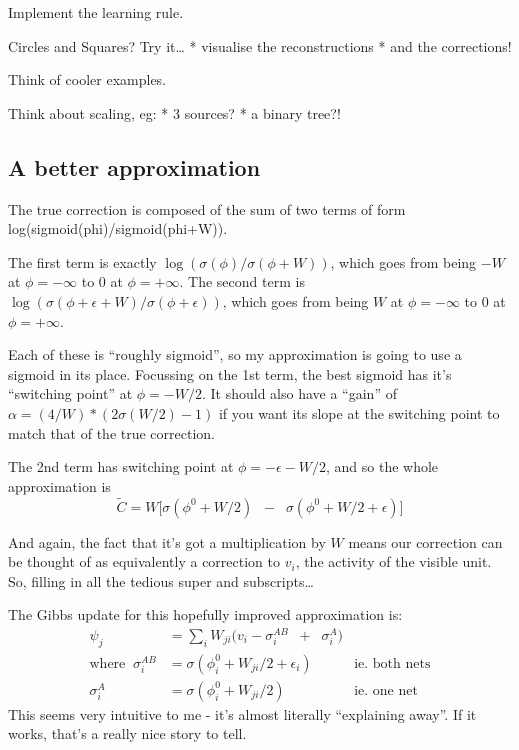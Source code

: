 \documentclass{article}
\begin{document}
Implement the learning rule.

Circles and Squares? Try it\ldots{} * visualise the reconstructions *
and the corrections!

Think of cooler examples.

Think about scaling, eg: * 3 sources? * a binary tree?!

    \subsection{A better approximation}\label{a-better-approximation}

The true correction is composed of the sum of two terms of form
log(sigmoid(phi)/sigmoid(phi+W)).

The first term is exactly \(\log(\sigma(\phi)/\sigma(\phi+W))\), which
goes from being \(-W\) at \(\phi=-\infty\) to \(0\) at \(\phi=+\infty\).
The second term is
\(\log(\sigma(\phi+\epsilon+W)/\sigma(\phi+\epsilon))\), which goes from
being \(W\) at \(\phi=-\infty\) to \(0\) at \(\phi=+\infty\).

Each of these is ``roughly sigmoid'', so my approximation is going to
use a sigmoid in its place. Focussing on the 1st term, the best sigmoid
has it's ``switching point'' at \(\phi = -W/2\). It should also have a
``gain'' of \(\alpha = (4/W)*(2\sigma(W/2)-1)\) if you want its slope at
the switching point to match that of the true correction.

The 2nd term has switching point at \(\phi = -\epsilon-W/2\), and so the
whole approximation is \[
\tilde{C} = W \bigg[ \sigma(\phi^0 + W/2) \;\; - \;\; \sigma(\phi^0 + W/2 + \epsilon) \bigg]
\]

And again, the fact that it's got a multiplication by \(W\) means our
correction can be thought of as equivalently a correction to \(v_i\),
the activity of the visible unit. So, filling in all the tedious super
and subscripts\ldots{}

The Gibbs update for this hopefully improved approximation is: \[
\begin{align}
\psi_j &= \sum_i W_{ji} \bigg( v_i - \sigma_i^{AB} \;\;+\;\; \sigma_i^A \bigg) \\
\text{where}\;\; \sigma_i^{AB} &= \sigma(\phi_i^0 + W_{ji}/2 +\epsilon_i) & \text{ie. both nets}
\\
\sigma_i^A &= \sigma(\phi_i^0 + W_{ji}/2) & \text{ie. one net}
\end{align}
\] This seems very intuitive to me - it's almost literally ``explaining
away''. If it works, that's a really nice story to tell.
\end{document}
